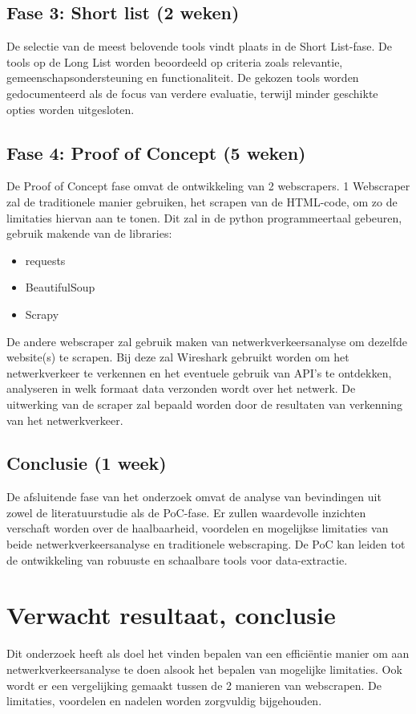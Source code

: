 \subsection{Fase 3: Short list (2 weken)}
De selectie van de meest belovende tools vindt plaats in de Short List-fase. De tools op de Long List worden beoordeeld op 
criteria zoals relevantie, gemeenschapsondersteuning en functionaliteit. 
De gekozen tools worden gedocumenteerd als de focus van verdere evaluatie, terwijl minder geschikte opties 
worden uitgesloten.

\subsection{Fase 4: Proof of Concept (5 weken)}
De Proof of Concept fase omvat de ontwikkeling van 2 webscrapers. 1 Webscraper zal de traditionele manier gebruiken, het scrapen van de HTML-code, om zo 
de limitaties hiervan aan te tonen. Dit zal in de python programmeertaal gebeuren, gebruik makende van de libraries:
\begin{itemize}
  \item requests
  \item BeautifulSoup
  \item Scrapy
\end{itemize}
 De andere webscraper zal gebruik maken van netwerkverkeersanalyse om dezelfde website(s) te scrapen. Bij deze zal Wireshark gebruikt worden om het netwerkverkeer
 te verkennen en het eventuele gebruik van API's te ontdekken, analyseren in welk formaat data verzonden wordt over het netwerk. De uitwerking van de 
 scraper zal bepaald worden door de resultaten van verkenning van het netwerkverkeer.
\subsection{Conclusie (1 week)}
De afsluitende fase van het onderzoek omvat de analyse van bevindingen uit zowel de literatuurstudie als de PoC-fase. 
Er zullen waardevolle inzichten verschaft worden over de haalbaarheid, voordelen en mogelijkse limitaties van beide netwerkverkeersanalyse en traditionele webscraping.
De PoC kan leiden tot de ontwikkeling van robuuste en schaalbare tools voor data-extractie.
\section{Verwacht resultaat, conclusie}%
\label{sec:verwachte_resultaten}
Dit onderzoek heeft als doel het vinden bepalen van een efficiëntie manier om aan netwerkverkeersanalyse te doen alsook het bepalen van mogelijke limitaties.
Ook wordt er een vergelijking gemaakt tussen de 2 manieren van webscrapen. De limitaties, voordelen en nadelen worden zorgvuldig bijgehouden.
